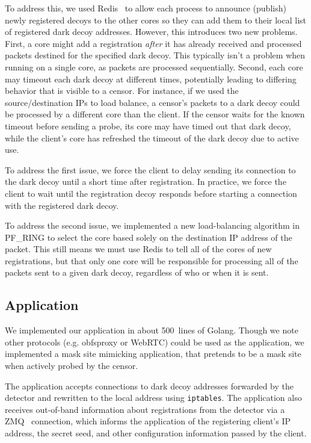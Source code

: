 \documentclass[letterpaper,twocolumn,10pt]{article}
\begin{document}
To address this, we used Redis~\cite{redis} to allow each process to announce
(publish) newly registered decoys to the other cores so they can
add them to their local list of registered dark decoy addresses.
However, this introduces two new problems. First, a core might add a
registration \emph{after} it has already received and processed packets destined
for the specified dark decoy. This typically isn't a problem when running on a
single core, as packets are processed sequentially. Second, each core may
timeout each dark decoy at different times, potentially leading to differing
behavior that is visible to a censor. For instance, if we used the
source/destination IPs to load balance, a censor's packets to a dark decoy could
be processed by a different core than the client. If the censor waits for the
known timeout before sending a probe, its core may have timed out that dark
decoy, while the client's core has refreshed the timeout of the dark decoy due
to active use.

To address the first issue, we force the client to delay sending its connection
to the dark decoy until a short time after registration. In practice, we force
the client to wait until the registration decoy responds before starting a
connection with the registered dark decoy.

To address the second issue, we implemented a new load-balancing algorithm in
PF\_RING to select the core based solely on the destination IP address of the
packet. This still means we must use Redis to tell all of the cores of new
registrations, but that only one core will be responsible for processing all of
the packets sent to a given dark decoy, regardless of who or when it is sent.


\subsection{Application}

We implemented our application in about 500~lines of Golang. Though we note
other protocols (e.g. obfsproxy or WebRTC) could be used as the application, we
implemented a mask site mimicking application, that pretends to be a mask site
when actively probed by the censor.

The application accepts connections to dark decoy addresses forwarded by the
detector and rewritten to the local address using \texttt{iptables}.
The application also receives out-of-band information about registrations from the
detector via a ZMQ~\cite{zmq} connection, which informs the application of the
registering client's IP address, the secret seed, and other configuration
information passed by the client.
\end{document}
